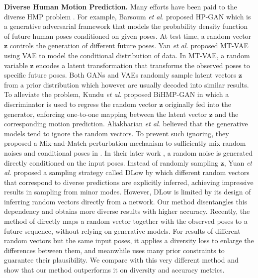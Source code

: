 \documentclass[sigconf,screen,nonacm]{acmart}
\begin{document}
	\textbf{Diverse Human Motion Prediction.} Many efforts have been paid to the diverse HMP problem \cite{barsoum2018hp,yan2018mt,kundu2019bihmp,yuan2020dlow,aliakbarian2020stochastic,liu2021aggregated,tanke2021intention,lyu2021learning,mao2021generating,aliakbarian2021contextually,cai2021unified}. For example, Barsoum \textit{et al.} \cite{barsoum2018hp} proposed HP-GAN which is a generative adversarial framework that models the probability density function of future human poses conditioned on given poses. At test time, a random vector $\mathbf{z}$ controls the generation of different future poses. Yan \textit{et al.} \cite{yan2018mt} proposed MT-VAE using VAE \cite{kingma2013auto, Liu:ICCV2021} to model the conditional distribution of data. In MT-VAE, a random variable $\mathbf{z}$ encodes a latent transformation that transforms the observed poses to specific future poses. Both GANs and VAEs randomly sample latent vectors $\mathbf{z}$ from a prior distribution which however are usually decoded into similar results. To alleviate the problem, Kundu \textit{et al.} \cite{kundu2019bihmp} proposed BiHMP-GAN in which a discriminator is used to regress the random vector $\mathbf{z}$ originally fed into the generator, enforcing one-to-one mapping between the latent vector $\mathbf{z}$ and the corresponding motion prediction. Aliakbarian \textit{et al.} \cite{aliakbarian2020stochastic} believed that the generative models tend to ignore the random vectors. To prevent such ignoring, they proposed a Mix-and-Match perturbation mechanism to sufficiently mix random noises and conditional poses in \cite{aliakbarian2020stochastic}. In their later work \cite{aliakbarian2021contextually}, a random noise is generated directly conditioned on the input poses. Instead of randomly sampling $\mathbf{z}$, Yuan \textit{et al.} \cite{yuan2020dlow} proposed a sampling strategy called DLow by which different random vectors that correspond to diverse predictions are explicitly inferred, achieving impressive results in sampling from minor modes. However, DLow is limited by its design of inferring random vectors directly from a network. Our method disentangles this dependency and obtains more diverse results with higher accuracy. Recently, the method of \cite{mao2021generating} directly maps a random vector together with the observed poses to a future sequence, without relying on generative models. For results of different random vectors but the same input poses, it applies a diversity loss to enlarge the differences between them, and meanwhile uses many prior constraints to guarantee their plausibility. We compare with this very different method and show that our method outperforms it on diversity and accuracy metrics.
	
\end{document}
